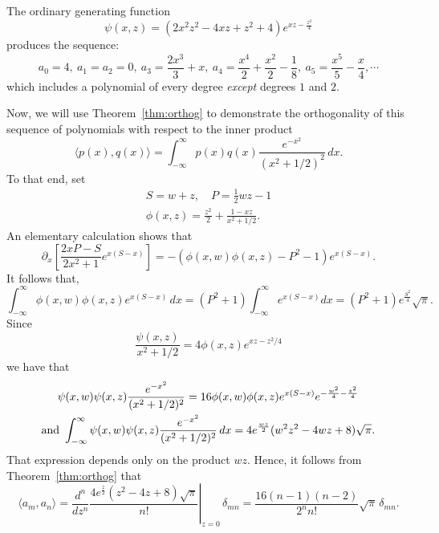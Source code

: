 \documentclass{amsart}
\newtheorem{prop}{Proposition}[section]
\theoremstyle{definition}
\theoremstyle{remark}
\numberwithin{equation}{section}
\begin{document}
The ordinary generating function
$$
\psi(x,z)= \left(2 x^2 z^2-4 x z+z^2+4\right) e^{x z-\frac{z^2}{4}}
$$
produces the sequence:
$$
a_0=4,\ a_1=a_2=0,\ a_3=\frac{2 x^3}{3}+x,\
a_4=\frac{x^4}{2}+\frac{x^2}{2}-\frac{1}{8},\
a_5=\frac{x^5}{5}-\frac{x}{4},\cdots
$$
which includes a polynomial of every degree \textit{except} degrees
$1$ and $2$.


Now, we will use Theorem~\ref{thm:orthog} to demonstrate the
orthogonality of this sequence of polynomials with respect to the
inner product
   \[
   \langle p(x),q(x)\rangle
   =\int_{-\infty}^{\infty}p(x)q(x)\frac{e^{-x^2}}{(x^2+1/2)^2}\,dx.
 \]
  To that end, set
  \begin{gather*}
    S=w+z,\quad P= \frac12 wz-1\\
    \phi(x,z) = \frac{z^2}{2}+ \frac{1-xz}{x^2+1/2}.
  \end{gather*}
An elementary calculation shows that
\begin{equation}
  \partial_x \left[ \frac{2xP-S}{2x^2+1} e^{x(S-x)}\right] =
-  \left(\phi(x,w)\phi(x,z) - P^2-1\right) e^{x(S-x)}.
\end{equation}
It follows that,
\[ \int_{-\infty}^\infty
  \phi(x,w)\phi(x,z) e^{x(S-x)}\,dx = ( P^2+1)\int_{-\infty}^\infty
  e^{x(S-x)}dx =( P^2+1) e^{\frac{S^2}4}\sqrt\pi.\]
Since
\[ \frac{\psi(x,z)}{x^2+1/2} = 4 \phi(x,z) e^{xz - z^2/4} \]
we have that
\begin{gather*}
 \psi(x,w) \psi(x,z) \frac{e^{-x^2}}{(x^2+1/2)^2}  = 16
 \phi(x,w)\phi(x,z) e^{x(S-x)} e^{-\frac{w^2}4-\frac{z^2}4}\\
\hbox{and }   \int_{-\infty}^\infty  \psi(x,w) \psi(x,z)
   \frac{e^{-x^2}}{(x^2+1/2)^2} \,dx = 4e^{\frac{wz}{2} }(w^2z^2-4 w z+8) \sqrt{\pi}.
 \end{gather*}
That expression depends only on the product $wz$.  Hence, it follows from
Theorem~\ref{thm:orthog} that
$$
\langle a_m,a_n\rangle=\left.\frac{d^n}{dz^n}\frac{4e^{\frac{z}{2} }(z^2-4  z+8) \sqrt{\pi}}{n!}\right|_{z=0}\,\delta_{mn}= \frac{16(n-1)(n-2)}{2^n n!}\sqrt\pi\,\delta_{mn}.
$$
\end{document}
